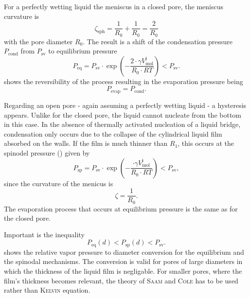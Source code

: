 \documentclass[../thesis.tex]{subfiles}
\begin{document}
      For a perfectly wetting liquid the meniscus in a closed pore, the meniscus curvature is
      \begin{equation*}
        \zeta_\mathrm{sph} = \frac{1}{R_0}+\frac{1}{R_0}=\frac{2}{R_0}
      \end{equation*}
      with the pore diameter $R_0$. The result is a shift of the condensation pressure $P_\mathrm{cond}$ from $P_\mathrm{sv}$ to equilibrium pressure
      \begin{equation}
        P_\mathrm{eq}=P_\mathrm{sv}\cdot\exp{\left(-\frac{2\cdot \gamma V_\mathrm{mol}^\mathrm{l}}{R_0\cdot RT}\right)}<P_\mathrm{sv}.
        \label{eq:p-eq}
      \end{equation}
       shows the reversibility of the process resulting in the evaporation pressure being
      \begin{equation*}
        P_\mathrm{evap}=P_\mathrm{cond}.
      \end{equation*}
      \medskip

      

      Regarding an open pore - again assuming a perfectly wetting liquid - a hysteresis appears. Unlike for the closed pore, the liquid cannot nucleate from the bottom in this case. In the absence of thermally activated nucleation of a liquid bridge, condensation only occurs due to the collapse of the cylindrical liquid film absorbed on the walls. If the film is much thinner than $R_1$, this occurs at the spinodel pressure (\cite{Cohan1938a}) given by
      \begin{equation}
        P_\mathrm{sp}=P_\mathrm{sv}\cdot\exp{\left(-\frac{\cdot \gamma V_\mathrm{mol}^\mathrm{l}}{R_0\cdot RT}\right)}<P_\mathrm{sv},
        \label{eq:p-sp}
      \end{equation}
      since the curvature of the menicus is
      \begin{equation*}
        \zeta = \frac{1}{R_0}.
      \end{equation*}
      The evaporation process that occurs at equilibrium pressure is the same as for the closed pore.

      Important is the inequality
      \begin{equation}
        P_\mathrm{eq}(d)<P_\mathrm{sp}(d)<P_\mathrm{sv}.
        \label{eq:cond-pressure-inequality}
      \end{equation}
       shows the relative vapor pressure to diameter conversion for the equilibrium and the spinodal mechanisms. The conversion is valid for pores of large diameters in which the thickness of the liquid film is negligable. For smaller pores, where the film's thickness becomes relevant, the theory of \textsc{Saam} and \textsc{Cole} has to be used rather than \textsc{Kelvin} equation.
\end{document}
